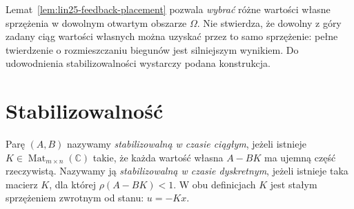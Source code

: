 \begin{uwaga}
\label{rem:lin25-poles}
Lemat~\ref{lem:lin25-feedback-placement}
pozwala \emph{wybrać}
różne wartości własne
sprzężenia w dowolnym
otwartym obszarze \(\Omega\).
Nie stwierdza,
że dowolny z góry zadany
ciąg wartości własnych
można uzyskać
przez to samo sprzężenie:
pełne twierdzenie
o rozmieszczaniu biegunów
jest silniejszym wynikiem.
Do udowodnienia
stabilizowalności
wystarczy podana konstrukcja.
\end{uwaga}

\section{Stabilizowalność}
\label{sec:lin25-stabilizability}

\begin{definicja}
\label{def:lin25-stabilizability}
Parę \((A,B)\)
nazywamy \emph{stabilizowalną
w czasie ciągłym},
jeżeli istnieje
\(K\in\operatorname{Mat}_{m\times n}(\mathbb C)\)
takie, że każda wartość własna
\(A-BK\) ma ujemną część
rzeczywistą.
Nazywamy ją
\emph{stabilizowalną
w czasie dyskretnym},
jeżeli istnieje taka macierz \(K\),
dla której
\(\rho(A-BK)<1\).
W obu definicjach \(K\)
jest stałym sprzężeniem
zwrotnym od stanu:
\(u=-Kx\).
\end{definicja}


